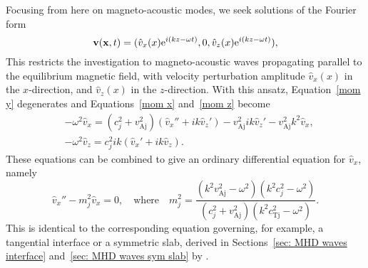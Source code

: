 \documentclass[12pt]{../style-files/ociamthesis}
\begin{document}
Focusing from here on magneto-acoustic modes, we seek solutions of the Fourier form
\begin{equation}
\mathbf{v}(\mathbf{x},t)=(\hat{v}_x(x)\textrm{e}^{i(kz-\omega{t})}, 0, \hat{v}_z(x)\textrm{e}^{i(kz-\omega{t})}),
\label{vcomponents}
\end{equation}
This restricts the investigation to magneto-acoustic waves propagating parallel to the equilibrium magnetic field, with velocity perturbation amplitude $\hat{v}_x(x)$ in the $x$-direction, and $\hat{v}_z(x)$ in the $z$-direction. With this ansatz, Equation~\eqref{mom y} degenerates and Equations~\eqref{mom x} and~\eqref{mom z} become
\begin{align}
&-\omega^2\hat{v}_x = (c_j^2+v_\textrm{Aj}^2)(\hat{v}_x'' + ik\hat{v}_z') - v_\textrm{Aj}^2ik\hat{v}_z'-v_\textrm{Aj}^2k^2\hat{v}_x, \label{mom x 2} \\
&-\omega^2\hat{v}_z = c_j^2ik(\hat{v}_x' + ik\hat{v}_z). \label{mom z 2}
\end{align}
These equations can be combined to give an ordinary differential equation for $\hat{v}_x$, namely
\begin{equation}
\hat{v}_x'' - m_j^2\hat{v}_x = 0, \quad \text{where} \quad
m_j^2 = \frac{(k^2v_\textrm{Aj}^2 - \omega^2)(k^2c_j^2 - \omega^2)}{(c_j^2 + v_\textrm{Aj}^2)(k^2c_\textrm{Tj}^2 - \omega^2)}. \label{v_x ODE}
\end{equation}
This is identical to the corresponding equation governing, for example, a tangential interface or a symmetric slab, derived in Sections~\ref{sec: MHD waves interface} and~\ref{sec: MHD waves sym slab} by \cite{rob81a,edw_etal82}.
\end{document}

